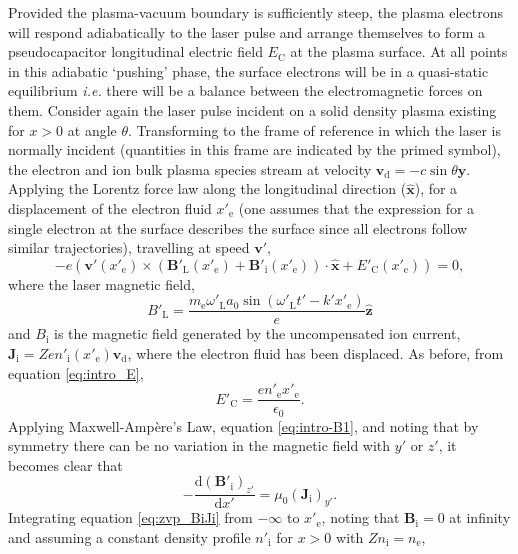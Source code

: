 Provided the plasma-vacuum boundary is sufficiently steep, the plasma electrons will respond adiabatically to the laser pulse and arrange themselves to form a pseudocapacitor longitudinal electric field $E_\mathrm{C}$ at the plasma surface. At all points in this adiabatic `pushing' phase, the surface electrons will be in a quasi-static equilibrium \textit{i.e.} there will be a balance between the electromagnetic forces on them. Consider again the laser pulse incident on a solid density plasma existing for $x>0$ at angle $\theta$. Transforming to the frame of reference in which the laser is normally incident (quantities in this frame are indicated by the primed symbol), the electron and ion bulk plasma species stream at velocity $\mathbf{v}_\mathrm{d} = -c \sin\theta \hat{\mathbf{y}}$.  Applying the Lorentz force law along the longitudinal direction ($\hat{\mathbf{x}}$), for a displacement of the electron fluid $x'_\mathrm{e}$ (one assumes that the expression for a single electron at the surface describes the surface since all electrons follow similar trajectories), travelling at speed $\mathbf{v'}$,
\begin{equation}\label{eq:zvp_eq}
	-e(\mathbf{v'}(x'_\mathrm{e})\times (\mathbf{B}'_\mathrm{L}(x'_\mathrm{e}) + \mathbf{B}'_\mathrm{i}(x'_\mathrm{e}))\cdot \hat{\mathbf{x}} + E'_\mathrm{C}(x'_\mathrm{e}) )= 0,
\end{equation}
where the laser magnetic field,
\begin{equation}\label{eq:zvp_Bl}
	B'_\mathrm{L} = \frac{m_\mathrm{e} \omega'_\mathrm{L}a_0\sin(\omega'_\mathrm{L}t'-k'x'_\mathrm{e})}{e} \hat{\mathbf{z}}
\end{equation}
and $B_\mathrm{i}$ is the magnetic field generated by the uncompensated ion current, $\mathbf{J_\mathrm{i}} =  Zen'_\mathrm{i}(x'_\mathrm{e}) \mathbf{v}_\mathrm{d}$, where the electron fluid has been displaced. As before, from equation \ref{eq:intro_E},
\begin{equation}\label{eq:zvp_Ec}
	E'_\mathrm{C} = \frac{en'_\mathrm{e}x'_\mathrm{e}}{\epsilon_0}.
\end{equation}
Applying Maxwell-Ampère's Law, equation \ref{eq:intro-B1}, and noting that by symmetry there can be no variation in the magnetic field with $y'$ or $z'$, it becomes clear that
\begin{equation}\label{eq:zvp_BiJi}
	-\frac{\mathrm{d}(\mathbf{B}'_\mathrm{i})_{z'}}{\mathrm{d} x'} = \mu_0 (\mathbf{J}_\mathrm{i})_{y'}.
\end{equation}
Integrating equation \ref{eq:zvp_BiJi} from $-\infty$ to $x'_\mathrm{e}$, noting that $\mathbf{B}_\mathrm{i} = 0$ at infinity and assuming a constant density profile $n'_\mathrm{i}$ for $x>0$ with $Zn_\mathrm{i} = n_\mathrm{e}$,
